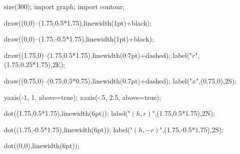 	size(300);  
    import graph;
    import contour;

    draw((0,0)--(1.75,0.5*1.75),linewidth(1pt)+black);
 
    draw((0,0)--(1.75,-0.5*1.75),linewidth(1pt)+black);
    
    draw((1.75,0)--(1.75,0.5*1.75),linewidth(0.7pt)+dashed);
	label("$r$",(1.75,0.25*1.75),2E);    

	draw((0.75,0)--(0.75,0.5*0.75),linewidth(0.7pt)+dashed);
	label("$x$",(0.75,0),2S);
    
    
	yaxis(-1, 1, above=true);
	xaxis(-.5, 2.5, above=true);
    
    dot((1.75,0.5*1.75),linewidth(6pt));
    label("$(h,r)$",(1.75,0.5*1.75),2N);
    
    dot((1.75,-0.5*1.75),linewidth(6pt));
    label("$(h,-r)$",(1.75,-0.5*1.75),2S);
    
    dot((0,0),linewidth(6pt));